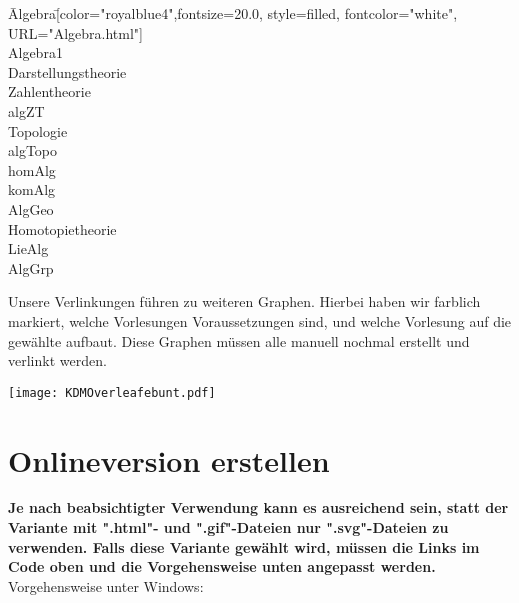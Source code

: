 \documentclass{article}
\begin{document}
\begin{tabbing}
\=Algebra\hspace{2cm}\= [color="royalblue4",fontsize=20.0, style=filled, fontcolor="white",\\
\>\>  URL="Algebra.html"]  \\
\>Algebra1\> [shape=box,label="Algebra 1, URL="Algebra1.html"]\\
\>Darstellungstheorie\> [URL="Darstellungstheorie.html"]\\
\>Zahlentheorie \>		[shape=box, URL="Zahlentheorie.html"]  \\
\>algZT\>[label="Algebraische Zahlentheorie", URL="algZT.html"] \\
\>Topologie \>	[shape=box, URL="Topologie.html"]  \\
\>algTopo \>[shape=box, label="Algebraische Topologie", URL="algTopo.html"]\\
\>homAlg \>[label="Homologische Algebra", URL="homAlg.html"] \\
\>komAlg\>[label="Kommutative Algebra", URL="komAlg.html"]\\
\>AlgGeo\>[label="Algebraische Geometrie", URL="AlgGeo.html"]\\
\>Homotopietheorie\> [URL="Homotopietheorie.html"]\\
\>LieAlg \>	[label="Lie Algebren", URL="LieAlg.html"]\\
\>	AlgGrp\>[label="Algebraische Gruppen", URL="AlgGrp.htlm"]  \\
\end{tabbing}

\noindent
Unsere Verlinkungen führen zu weiteren Graphen. Hierbei haben wir farblich markiert, welche Vorlesungen Voraussetzungen sind, und welche Vorlesung auf die gewählte aufbaut. Diese Graphen müssen alle manuell nochmal erstellt und verlinkt werden.

\begin{minipage}{1.2 \textwidth}
    \texttt{[image: KDMOverleafebunt.pdf]}
\end{minipage}

\section{Onlineversion erstellen}

\textbf{Je nach beabsichtigter Verwendung kann es ausreichend sein, statt der Variante mit ".html"- und ".gif"-Dateien nur ".svg"-Dateien zu verwenden. Falls diese Variante gewählt wird, müssen die Links im Code oben und die Vorgehensweise unten angepasst werden.}\\
Vorgehensweise unter Windows:
\end{document}
